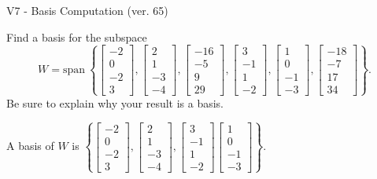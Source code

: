 \begin{exercise}
  \begin{exerciseTitle}V7 - Basis Computation (ver. 65)\end{exerciseTitle}
  \begin{exerciseStatement}
    Find a basis for the subspace 
\[W=\mathrm{span}\ \left\{\left[\begin{array}{r}
-2 \\
0 \\
-2 \\
3
\end{array}\right] , \left[\begin{array}{r}
2 \\
1 \\
-3 \\
-4
\end{array}\right] , \left[\begin{array}{r}
-16 \\
-5 \\
9 \\
29
\end{array}\right] , \left[\begin{array}{r}
3 \\
-1 \\
1 \\
-2
\end{array}\right] , \left[\begin{array}{r}
1 \\
0 \\
-1 \\
-3
\end{array}\right] , \left[\begin{array}{r}
-18 \\
-7 \\
17 \\
34
\end{array}\right]\right\}.\]
 Be sure to explain why your result is a basis.


  \end{exerciseStatement}
  \begin{exerciseAnswer}
   A basis of \(W\) is  \(\left\{\left[\begin{array}{r}
-2 \\
0 \\
-2 \\
3
\end{array}\right] , \left[\begin{array}{r}
2 \\
1 \\
-3 \\
-4
\end{array}\right] , \left[\begin{array}{r}
3 \\
-1 \\
1 \\
-2
\end{array}\right] \left[\begin{array}{r}
1 \\
0 \\
-1 \\
-3
\end{array}\right]\right\}\).
  


  \end{exerciseAnswer}
\end{exercise}